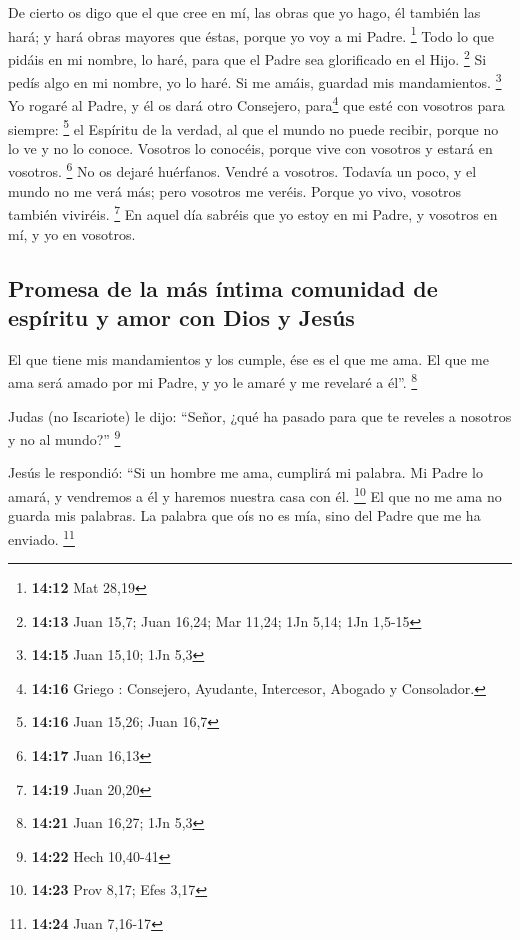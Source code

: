  De cierto os digo que el que cree en mí, las obras que
yo hago, él también las hará; y hará obras mayores que éstas, porque yo
voy a mi Padre. \footnote{\textbf{14:12} Mat 28,19}  Todo
lo que pidáis en mi nombre, lo haré, para que el Padre sea glorificado
en el Hijo. \footnote{\textbf{14:13} Juan 15,7; Juan 16,24; Mar 11,24;
  1Jn 5,14; 1Jn 1,5-15}  Si pedís algo en mi nombre, yo
lo haré.  Si me amáis, guardad mis mandamientos.
\footnote{\textbf{14:15} Juan 15,10; 1Jn 5,3}  Yo rogaré
al Padre, y él os dará otro Consejero, para\footnote{\textbf{14:16}
  Griego : Consejero, Ayudante, Intercesor, Abogado y
  Consolador.} que esté con vosotros para siempre: \footnote{\textbf{14:16}
  Juan 15,26; Juan 16,7}  el Espíritu de la verdad, al
que el mundo no puede recibir, porque no lo ve y no lo conoce. Vosotros
lo conocéis, porque vive con vosotros y estará en vosotros. \footnote{\textbf{14:17}
  Juan 16,13}  No os dejaré huérfanos. Vendré a vosotros.
 Todavía un poco, y el mundo no me verá más; pero
vosotros me veréis. Porque yo vivo, vosotros también viviréis.
\footnote{\textbf{14:19} Juan 20,20}  En aquel día
sabréis que yo estoy en mi Padre, y vosotros en mí, y yo en vosotros.

\hypertarget{promesa-de-la-muxe1s-uxedntima-comunidad-de-espuxedritu-y-amor-con-dios-y-jesuxfas}{%
\subsection{Promesa de la más íntima comunidad de espíritu y amor con
Dios y
Jesús}\label{promesa-de-la-muxe1s-uxedntima-comunidad-de-espuxedritu-y-amor-con-dios-y-jesuxfas}}

 El que tiene mis mandamientos y los cumple, ése es el
que me ama. El que me ama será amado por mi Padre, y yo le amaré y me
revelaré a él''. \footnote{\textbf{14:21} Juan 16,27; 1Jn 5,3}

 Judas (no Iscariote) le dijo: ``Señor, ¿qué ha pasado
para que te reveles a nosotros y no al mundo?'' \footnote{\textbf{14:22}
  Hech 10,40-41}

 Jesús le respondió: ``Si un hombre me ama, cumplirá mi
palabra. Mi Padre lo amará, y vendremos a él y haremos nuestra casa con
él. \footnote{\textbf{14:23} Prov 8,17; Efes 3,17}  El
que no me ama no guarda mis palabras. La palabra que oís no es mía, sino
del Padre que me ha enviado. \footnote{\textbf{14:24} Juan 7,16-17}

